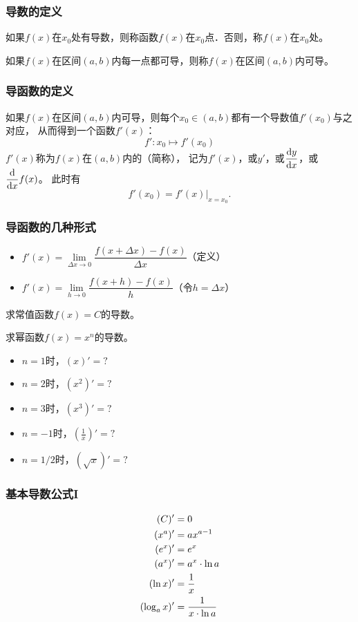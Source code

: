 \documentclass[14pt,notheorems,leqno,xcolor={rgb}]{beamer} %
\begin{document}
\begin{frame}
\frametitle{导数的定义}
如果$f(x)$在$x_0$处有导数，则称函数$f(x)$在$x_0$点．\pause 否则，称$f(x)$在$x_0$处。\pause\par
如果$f(x)$在区间$(a,b)$内每一点都可导，则称$f(x)$在区间$(a,b)$内可导。
\end{frame}

\begin{frame}
\frametitle{导函数的定义}
如果$f(x)$在区间$(a,b)$内可导，则每个$x_0\in(a,b)$都有一个导数值$f'(x_0)$与之对应，\pause
从而得到一个函数$f'(x)$：
$$f': x_0 \longmapsto f'(x_0)$$\pause
$f'(x)$称为$f(x)$在$(a,b)$内的（简称），\pause
记为$f'(x)$，或$y'$，或$\dfrac{\mathop{}\!\mathrm{d} y}{\mathop{}\!\mathrm{d} x}$，或 $\dfrac{\mathop{}\!\mathrm{d}}{\mathop{}\!\mathrm{d} x}f(x)$。\pause
此时有
$$f'(x_0)=f'(x)|_{x=x_0}.$$
\end{frame}

\begin{frame}
\frametitle{导函数的几种形式}
\begin{itemize}[<+->]
  \item $f'(x)=\lim\limits_{\Delta x\to0}\dfrac{f(x+\Delta x)-f(x)}{\Delta x}$（定义）
  \item $f'(x)=\lim\limits_{h\to0}\dfrac{f(x+h)-f(x)}{h}$（令$h=\Delta x$）
\end{itemize}
\end{frame}

\begin{frame}
\begin{example}
  求常值函数$f(x)=C$的导数。
\end{example}
\vpause
\begin{example}
  求幂函数$f(x)=x^n$的导数。
\end{example}\pause
\begin{itemize}[<+->]
  \item $n=1$时，$(x)'=?$
  \item $n=2$时，$(x^2)'=?$
  \item $n=3$时，$(x^3)'=?$
  \item $n=-1$时，$(\frac1x)'=?$
  \item $n=1/2$时，$(\sqrt x)'=?$
\end{itemize}
\end{frame}

\begin{frame}
\frametitle{基本导数公式I}
\noindent
\begin{align}
(C)'   &=0 \\
(x^a)' &= ax^{a-1}\\
(e^x)'      &=e^x\\
(a^x)'      &= a^x\cdot\ln a\\
(\ln x)'    &= \frac1x\\
(\log_a x)' &=\frac1{x\cdot\ln a}\\\notag
\end{align}
\end{frame}
\end{document}
